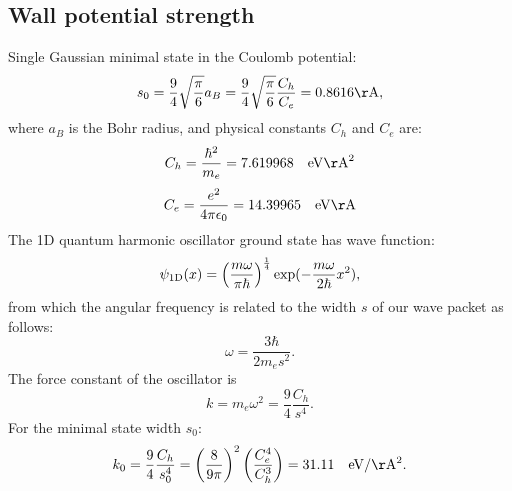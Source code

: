 \documentclass[a4paper,12pt]{article}
\begin{document}
\subsection*{Wall potential strength}
Single Gaussian minimal state in the Coulomb potential:
\begin{equation}
s_0 = \frac{9}{4}\sqrt{\frac{\pi}{6}}a_B = \frac{9}{4}\sqrt{\frac{\pi}{6}}\frac{C_h}{C_e} = 0.8616 \rm{\AA},
\end{equation} 
where $a_B$ is the Bohr radius, and physical constants $C_h$ and $C_e$ are:
\begin{equation}
C_h = \frac{\hbar^2}{m_e} = 7.619968\quad \rm{eV\AA}^2
\end{equation} 
\begin{equation}
C_e = \frac{e^2}{4\pi\epsilon_0} = 14.39965\quad \rm{eV\AA}
\end{equation} 
The 1D quantum harmonic oscillator ground state has wave function:
\begin{equation}
\psi_{\rm{1D}}(x) = \left(\frac{m\omega}{\pi\hbar} \right)^\frac{1}{4}\exp(-\frac{m\omega}{2\hbar}x^2),
\end{equation} 
from which the angular frequency is related to the width $s$ of our wave packet as follows:
\begin{equation}
\omega =\frac{3\hbar}{2m_es^2}.
\end{equation} 
The force constant of the oscillator is
\begin{equation}
k= m_e \omega^2  =\frac{9}{4}\frac{C_h}{s^4}.
\end{equation} 
For the minimal state width $s_0$:
\begin{equation}
k_0=\frac{9}{4}\frac{C_h}{s_0^4} = \left(\frac{8}{9\pi}\right)^2\left(\frac{C_e^4}{C_h^3}\right)= 31.11\quad{\rm eV}/{\rm \AA^2}.
\end{equation} 







\end{document}
